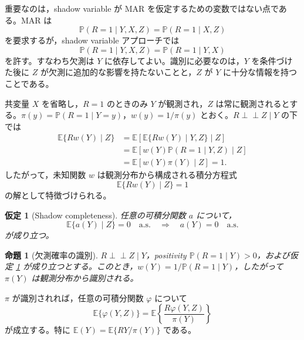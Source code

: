 \documentclass[10pt,a4paper]{article}
\newtheorem{assumption}{仮定}
\newtheorem{proposition}{命題}
\newcommand{\indep}{\mathrel{\perp\!\!\!\perp}}
\newcommand{\E}{\mathbb{E}}
\newcommand{\Prb}{\mathbb{P}}
\newcommand{\1}{\mathbf{1}}
\begin{document}
重要なのは，shadow variable が MAR を仮定するための変数ではない点である。MAR は
\begin{equation}
  \Prb(R=1\mid Y,X,Z)=\Prb(R=1\mid X,Z)
\end{equation}
を要求するが，shadow variable アプローチでは
\begin{equation}
  \Prb(R=1\mid Y,X,Z)=\Prb(R=1\mid Y,X)
\end{equation}
を許す。すなわち欠測は $Y$ に依存してよい。識別に必要なのは，$Y$ を条件づけた後に $Z$ が欠測に追加的な影響を持たないことと，$Z$ が $Y$ に十分な情報を持つことである。

共変量 $X$ を省略し，$R=1$ のときのみ $Y$ が観測され，$Z$ は常に観測されるとする。$\pi(y)=\Prb(R=1\mid Y=y)$，$w(y)=1/\pi(y)$ とおく。$R\indep Z\mid Y$ の下では
\begin{align}
  \E\{Rw(Y)\mid Z\}
  &=\E\left[\E\{Rw(Y)\mid Y,Z\}\mid Z\right] \\
  &=\E\left[w(Y)\Prb(R=1\mid Y,Z)\mid Z\right] \\
  &=\E\left[w(Y)\pi(Y)\mid Z\right]=1.
  \label{eq:shadow-moment-basic}
\end{align}
したがって，未知関数 $w$ は観測分布から構成される積分方程式
\begin{equation}
  \E\{Rw(Y)\mid Z\}=1
  \label{eq:shadow-integral-equation}
\end{equation}
の解として特徴づけられる。

\begin{assumption}[Shadow completeness]
\label{ass:shadow-completeness-review}
任意の可積分関数 $a$ について，
\begin{equation}
  \E\{a(Y)\mid Z\}=0\quad \mathrm{a.s.}
  \quad\Longrightarrow\quad
  a(Y)=0\quad \mathrm{a.s.}
  \label{eq:shadow-completeness-review}
\end{equation}
が成り立つ。
\end{assumption}

\begin{proposition}[欠測確率の識別]
\label{prop:shadow-propensity-id}
$R\indep Z\mid Y$，positivity $\Prb(R=1\mid Y)>0$，および仮定 \ref{ass:shadow-completeness-review} が成り立つとする。このとき，$w(Y)=1/\Prb(R=1\mid Y)$，したがって $\pi(Y)$ は観測分布から識別される。
\end{proposition}

$\pi$ が識別されれば，任意の可積分関数 $\varphi$ について
\begin{equation}
  \E\{\varphi(Y,Z)\}
  =\E\left\{\frac{R\varphi(Y,Z)}{\pi(Y)}\right\}
  \label{eq:shadow-ipw-functional}
\end{equation}
が成立する。特に $\E(Y)=\E\{RY/\pi(Y)\}$ である。
\end{document}
